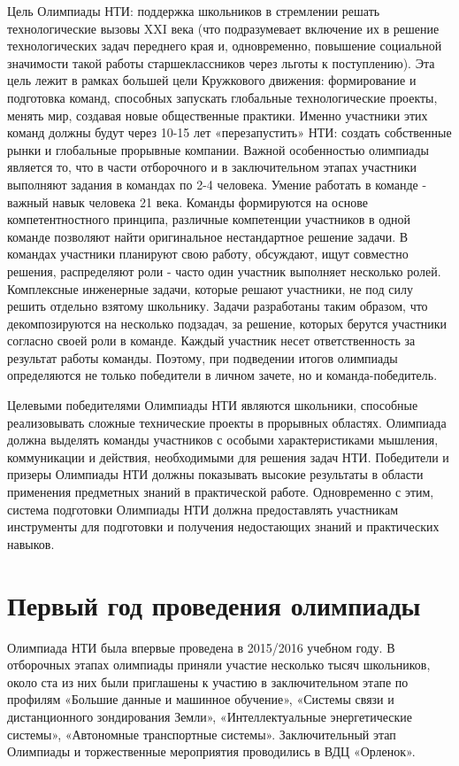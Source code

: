 Цель Олимпиады НТИ: поддержка школьников в стремлении решать технологические вызовы XXI века (что подразумевает включение их в решение технологических задач переднего края и, одновременно, повышение социальной значимости такой работы старшеклассников через льготы к поступлению). Эта цель лежит в рамках большей цели Кружкового движения: формирование и подготовка команд, способных запускать глобальные технологические проекты, менять мир, создавая новые общественные практики. Именно участники этих команд должны будут через 10-15 лет «перезапустить» НТИ: создать собственные рынки и глобальные прорывные компании.  Важной особенностью олимпиады является то, что в части отборочного и в заключительном этапах участники выполняют задания в командах по 2-4 человека. Умение работать в команде - важный навык человека 21 века. Команды формируются на основе компетентностного принципа, различные компетенции участников в одной команде позволяют найти оригинальное нестандартное решение задачи.  В командах участники планируют свою работу, обсуждают, ищут совместно решения, распределяют роли - часто один участник выполняет несколько ролей. Комплексные инженерные задачи, которые решают участники, не под силу решить отдельно взятому школьнику. Задачи разработаны таким образом, что декомпозируются на несколько подзадач, за решение, которых берутся участники согласно своей роли в команде. Каждый участник несет ответственность за результат работы команды. Поэтому, при подведении итогов олимпиады определяются не только победители в личном зачете, но и команда-победитель. 

Целевыми победителями Олимпиады НТИ являются школьники, способные реализовывать сложные технические проекты в прорывных областях. Олимпиада должна выделять команды участников с особыми характеристиками мышления, коммуникации и действия, необходимыми для решения задач НТИ. Победители и призеры Олимпиады НТИ должны показывать высокие результаты в области применения предметных знаний в практической работе. Одновременно с этим, система подготовки Олимпиады НТИ должна предоставлять участникам инструменты для подготовки и получения недостающих знаний и практических навыков.

\section*{Первый год проведения олимпиады}

Олимпиада НТИ была впервые проведена в 2015/2016 учебном году. В отборочных этапах олимпиады приняли участие несколько тысяч школьников, около ста из них были приглашены к участию в заключительном этапе по профилям «Большие данные и машинное обучение», «Системы связи и дистанционного зондирования Земли», «Интеллектуальные энергетические системы», «Автономные транспортные системы». Заключительный этап Олимпиады и торжественные мероприятия проводились в ВДЦ «Орленок». 

